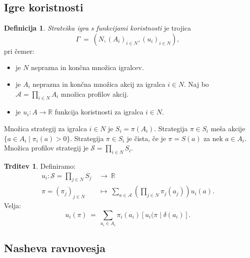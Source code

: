 \documentclass[11pt]{article}
\newcommand{\R}{\mathbb{R}}
\newcommand{\A}{\mathscr{A}}
\renewcommand{\S}{\mathscr{S}}
\newcommand{\set}[1]{\{#1\}}
\newcommand{\oklepaj}[1]{\left(#1\right)}
\newcommand{\oglati}[1]{\left[#1\right]}
\newcommand{\1}{\mathbbm{1}}
\theoremstyle{definition}
\newtheorem{definicija}{Definicija}[section]
\theoremstyle{definition}
\newtheorem{trditev}{Trditev}[section]
\theoremstyle{definition}
\theoremstyle{definition}
\begin{document}

\subsection{Igre koristnosti}
\vspace{0.5cm}

\begin{definicija}

\textit{Strateška igra s funkcijami koristnosti} je trojica 
$$\Gamma ~=~ (N, (A_i)_{i \in N}, (u_i)_{i \in N}),$$
pri čemer:
\begin{itemize}
	\item je $N$ neprazna in končna množica igralcev.
	\item je $A_i$ neprazna in končna množica akcij za igralca $i \in N$. Naj bo $\A = \prod_{i \in N} A_i$ množica profilov akcij.
	\item je $u_i: A \rightarrow \R$ funkcija koristnosti za igralca $i \in N$.
\end{itemize}

\noindent Množica strategij za igralca $i \in N$ je $S_i = \pi(A_i)$. Strategija $\pi \in S_i$ meša akcije $\set{a \in A_i \mid \pi_i(a) > 0}$. Strategija $\pi \in S_i$ je čista, če je $\pi = S(a)$ za nek $a \in A_i$. Množica profilov strategij je $\S = \prod_{i \in N} S_i$.

\end{definicija}
\vspace{0.5cm}

\begin{trditev}

Definiramo:
\begin{align*}
u_i: \S = \prod_{j \in N} S_j ~&\rightarrow~ \R \\
\pi = (\pi_j)_{j \in N} ~&\mapsto~ \sum_{a \in \A} \oklepaj{\prod_{j \in N}\pi_j(a_j)} u_i(a).
\end{align*}
Velja:
$$u_i(\pi) ~=~ \sum_{a_i \in A_i} \pi_i(a_i) \oglati{u_i(\pi \mid \delta(a_i)}.$$

\end{trditev}
\vspace{0.5cm}


\subsection{Nasheva ravnovesja}
\vspace{0.5cm}
\end{document}
